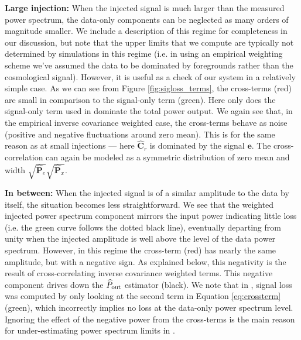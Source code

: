 \documentclass[preprint2,numberedappendix,tighten]{aastex6}  %
\begin{document}
{\bf Large injection:}
When the injected signal is much larger than the measured power spectrum, the data-only components can 
be neglected as many orders of magnitude smaller. We include a description of this regime for completeness in our discussion, but note that the upper limits that we compute are typically not determined by simulations in this regime (i.e. in using an empirical weighting scheme we've assumed the data to be dominated by foregrounds rather than the cosmological signal).  However, it is useful as a check of our system in a relatively simple case. As we can see from Figure \ref{fig:sigloss_terms}, the cross-terms (red) are small in comparison to the signal-only term (green). Here only does the signal-only term used in   dominate the total power output. We again see that, in the empirical inverse covariance weighted case, the cross-terms behave as noise (positive and negative fluctuations around zero mean). This is for the same reason as at small injections --- here $\widehat{\textbf{C}}_{r}$ is dominated by the signal $\textbf{e}$. The cross-correlation can again be modeled as a symmetric distribution of zero mean and width $\sqrt{\widehat{\textbf{P}}_e}\sqrt{\widehat{\textbf{P}}_x}$.

{\bf In between:}
When the injected signal is of a similar amplitude to the data by itself, the situation becomes less straightforward. We see that 
the weighted injected power spectrum component mirrors the input power indicating little loss (i.e. the green curve follows the dotted black line), eventually 
departing from unity when the injected amplitude is well above the level of the data power spectrum. However, 
in this regime the cross-term (red) has nearly the same amplitude, but with a negative sign. As explained below, this negativity is the result of cross-correlating inverse covariance weighted terms.  This negative component drives down the $\widehat{P}_{\rm out}$ estimator (black). We note that in , signal loss was computed by only looking at the second term in Equation \eqref{eq:crossterm} (green), which incorrectly implies no loss at the data-only power spectrum level. Ignoring the effect of the negative power from the cross-terms is the main reason for under-estimating power spectrum limits in .
\end{document}
